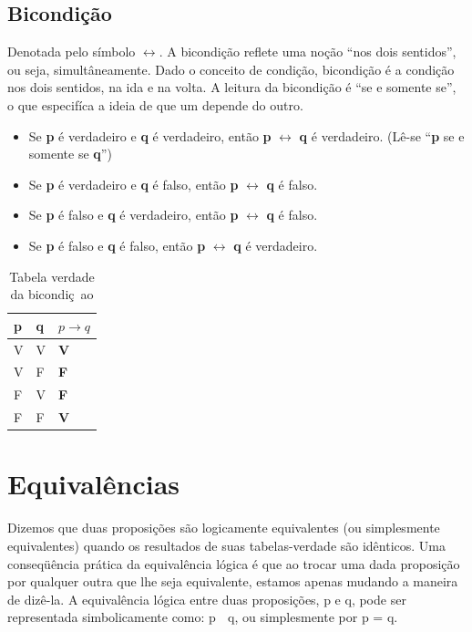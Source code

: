 \documentclass[a4paper,12pt,twoside,BCOR=10mm]{scrbook}
\begin{document}
\begin{titlepage}
\subsection{Bicondição}
Denotada pelo símbolo $\leftrightarrow$. A bicondição reflete uma noção “nos dois sentidos”, ou seja, simultâneamente. Dado o conceito de condição, bicondição é a condição nos dois sentidos, na ida e na volta. A leitura da bicondição é “se e somente se”, o que especifíca a ideia de que um depende do outro.

\begin{itemize}
\item Se \textbf{p} é verdadeiro e \textbf{q} é verdadeiro, então \textbf{p} $\leftrightarrow$ \textbf{q} é verdadeiro. (Lê-se “\textbf{p} se e somente se \textbf{q}”)
\item Se \textbf{p} é verdadeiro e \textbf{q} é falso, então \textbf{p} $\leftrightarrow$ \textbf{q} é falso.
\item Se \textbf{p} é falso e \textbf{q} é verdadeiro, então \textbf{p} $\leftrightarrow$ \textbf{q} é falso.
\item Se \textbf{p} é falso e \textbf{q} é falso, então \textbf{p} $\leftrightarrow$ \textbf{q} é verdadeiro.
\end{itemize}

\begin{table}[htb]
\centering
\caption{Tabela verdade da bicondiç~ao}
     \sffamily \begin{tabularx}{1.0\textwidth}{ p{5cm}  p{5cm}  p{5cm} }
    \hline
   \textbf{p} \hfill & \textbf{q} \hfill & {$p \rightarrow q$} \\ \hline
    V & V & \textbf{V}\\
    V & F & \textbf{F}\\
    F & V & \textbf{F}\\
    F & F & \textbf{V}\\ \hline
    \end{tabularx} \normalfont
\label{table:Emissivity}
\end{table}

\section{Equivalências}
Dizemos que duas proposições são logicamente equivalentes (ou simplesmente equivalentes) quando os resultados de suas tabelas-verdade são idênticos. Uma conseqüência prática da equivalência lógica é que ao trocar uma dada proposição por qualquer outra que lhe seja equivalente, estamos apenas mudando a maneira de dizê-la. A equivalência lógica entre duas proposições, p e q, pode ser representada simbolicamente como: p  q, ou simplesmente por p = q.


\end{titlepage}
\end{document}
